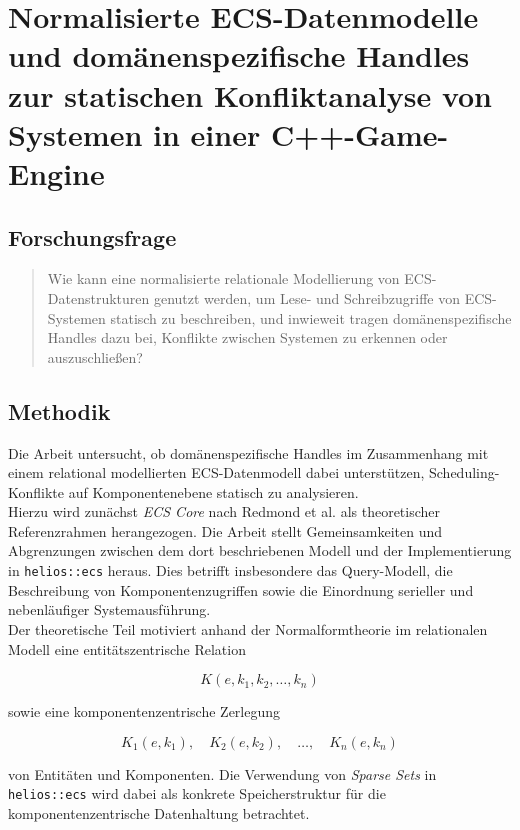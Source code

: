 \chapter{Normalisierte ECS-Datenmodelle und domänenspezifische Handles zur statischen Konfliktanalyse von Systemen in einer C++-Game-Engine}\label{ch:vorschlag1}

\section{Forschungsfrage}

\begin{quote}
    Wie kann eine normalisierte relationale Modellierung von ECS-Datenstrukturen genutzt werden, um Lese- und Schreibzugriffe von ECS-Systemen statisch zu beschreiben, und inwieweit tragen domänenspezifische Handles dazu bei, Konflikte zwischen Systemen zu erkennen oder auszuschließen?
\end{quote}


\section{Methodik}

Die Arbeit untersucht, ob domänenspezifische Handles im Zusammenhang mit einem relational modellierten ECS-Datenmodell dabei unterstützen, Scheduling-Konflikte auf Komponentenebene statisch zu analysieren.\\

Hierzu wird zunächst \textit{ECS Core} nach Redmond et {al.} als theoretischer Referenzrahmen herangezogen.
Die Arbeit stellt Gemeinsamkeiten und Abgrenzungen zwischen dem dort beschriebenen Modell und der Implementierung in \texttt{helios::ecs} heraus.
Dies betrifft insbesondere das Query-Modell, die Beschreibung von Komponentenzugriffen sowie die Einordnung serieller und nebenläufiger Systemausführung.\\

Der theoretische Teil motiviert anhand der Normalformtheorie im relationalen Modell eine entitätszentrische Relation

\[
    K(e, k_1, k_2, \ldots, k_n)
\]

\noindent
sowie eine komponentenzentrische Zerlegung

\[
    K_1(e, k_1),\quad K_2(e, k_2),\quad \ldots,\quad K_n(e, k_n)
\]

\noindent
von Entitäten und Komponenten.
Die Verwendung von \textit{Sparse Sets} in \texttt{helios::ecs} wird dabei als konkrete Speicherstruktur für die komponentenzentrische Datenhaltung betrachtet.\\

